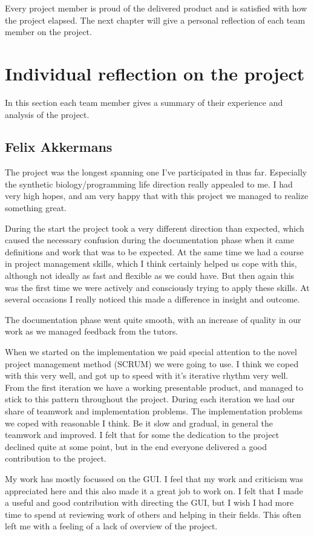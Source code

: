 \documentclass[a4paper]{article}
\begin{document}
Every project member is proud of the delivered product and is satisfied with how the project elapsed. The next chapter will give a personal reflection of each team member on the project.

\section{Individual reflection on the project} %
\label{individual-reflection}
In this section each team member gives a summary of their experience and analysis of the project.
\subsection{Felix Akkermans}
The project was the longest spanning one I've participated in thus far. Especially the synthetic biology/programming life direction really appealed to me. I had very high hopes, and am very happy that with this project we managed to realize something great.

During the start the project took a very different direction than expected, which caused the necessary confusion during the documentation phase when it came definitions and work that was to be expected. At the same time we had a course in project management skills, which I think certainly helped us cope with this, although not ideally as fast and flexible as we could have. But then again this was the first time we were actively and consciously trying to apply these skills. At several occasions I really noticed this made a difference in insight and outcome.

The documentation phase went quite smooth, with an increase of quality in our work as we managed feedback from the tutors.

When we started on the implementation we paid special attention to the novel project management method (SCRUM) we were going to use. I think we coped with this very well, and got up to speed with it's iterative rhythm very well. From the first iteration we have a working presentable product, and managed to stick to this pattern throughout the project. During each iteration we had our share of teamwork and implementation problems. The implementation problems we coped with reasonable I think. Be it slow and gradual, in general the teamwork and improved. I felt that for some the dedication to the project declined quite at some point, but in the end everyone delivered a good contribution to the project.

My work has mostly focussed on the GUI. I feel that my work and criticism was appreciated here and this also made it a great job to work on. I felt that I made a useful and good contribution with directing the GUI, but I wish I had more time to spend at reviewing work of others and helping in their fields. This often left me with a feeling of a lack of overview of the project. 
\end{document}
